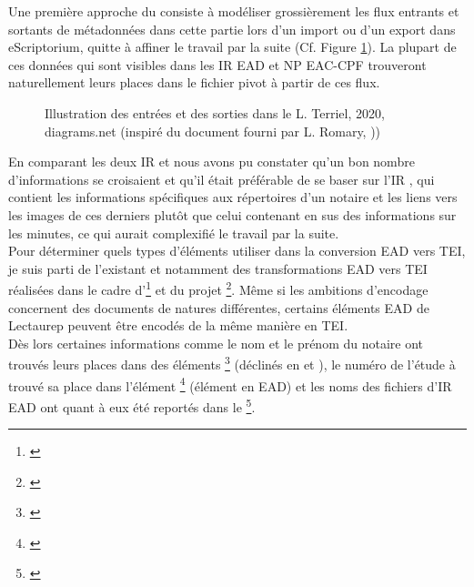 Une première approche du  consiste à modéliser grossièrement les flux entrants et sortants de métadonnées dans cette partie lors d'un import ou d'un export dans eScriptorium, quitte à affiner le travail par la suite (Cf. Figure \ref{fig:flux_teiheader}). La plupart de ces données qui sont visibles dans les IR EAD et NP EAC-CPF trouveront naturellement leurs places dans le fichier pivot à partir de ces flux.

\begin{figure}[h]
    \centering
    \centerline{}
    \caption{Illustration des entrées et des sorties dans le  \textcopyright L. Terriel, 2020, diagrams.net (inspiré du document fourni par L. Romary, ))}
    \label{fig:flux_teiheader}
\end{figure}

En comparant les deux IR  et  nous avons pu constater qu'un bon nombre d'informations se croisaient et qu'il était préférable de se baser sur l'IR , qui contient les informations spécifiques aux répertoires d'un notaire et les liens vers les images de ces derniers plutôt que celui contenant en sus des informations sur les minutes, ce qui aurait complexifié le travail par la suite.\\

Pour déterminer quels types d'éléments utiliser dans la conversion EAD vers TEI, je suis parti de l'existant et notamment des transformations EAD vers TEI réalisées dans le cadre d'\footnote{\cite{stutzmann_ead-tei_2019}} et du projet \footnote{\cite{university_of_oxford_-__bodleian_library_ead2enrich_nodate}}. Même si les ambitions d'encodage concernent des documents de natures différentes, certains éléments EAD de Lectaurep peuvent être encodés de la même manière en TEI.\\

Dès lors certaines informations comme le nom et le prénom du notaire ont trouvés leurs places dans des éléments \footnote{\cite{tei_tei_nodate-9}} (déclinés en  et ), le numéro de l'étude à trouvé sa place dans l'élément \footnote{\cite{tei_tei_nodate-8}} (élément  en EAD) et les noms des fichiers d'IR EAD ont quant à eux été reportés dans le \footnote{\cite{tei_tei_nodate-7}}.\\

